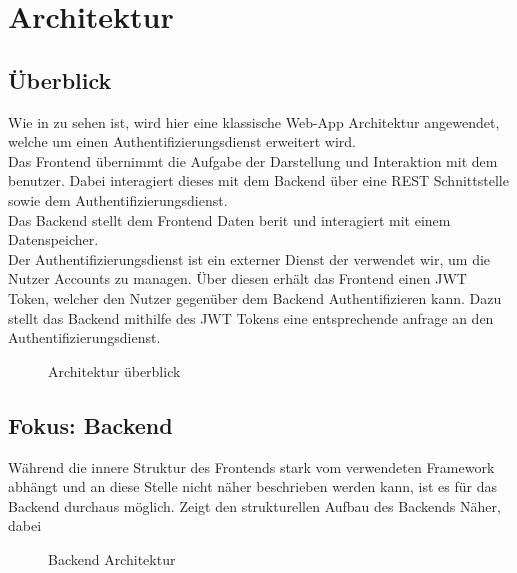 \chapter{Architektur}\label{ch:architektur}

\section{Überblick}\label{sec:uberblick}
Wie in  zu sehen ist, wird hier eine klassische Web-App Architektur angewendet,
welche um einen Authentifizierungsdienst erweitert wird.\\
Das Frontend übernimmt die Aufgabe der Darstellung und Interaktion mit dem benutzer.
Dabei interagiert dieses mit dem Backend über eine \ac{REST} Schnittstelle sowie dem Authentifizierungsdienst.\\
Das Backend stellt dem Frontend Daten berit und interagiert mit einem Datenspeicher.\\
Der Authentifizierungsdienst ist ein externer Dienst der verwendet wir, um die Nutzer Accounts zu managen.
Über diesen erhält das Frontend einen \ac{JWT} Token, welcher den Nutzer gegenüber dem Backend Authentifizieren kann.
Dazu stellt das Backend mithilfe des \ac{JWT} Tokens eine entsprechende anfrage an den Authentifizierungsdienst.

\begin{figure}[h]
    
    \caption{Architektur überblick}\label{fig:HighLevelArch}
\end{figure}

\section{Fokus: Backend}\label{sec:fokus:-backend}

Während die innere Struktur des Frontends stark vom verwendeten Framework abhängt und an diese Stelle nicht näher beschrieben werden kann,
ist es für das Backend durchaus möglich.
 Zeigt den strukturellen Aufbau des Backends Näher, dabei

\begin{figure}[h]
    
    \caption{Backend Architektur}\label{fig:BackendArch}
\end{figure}